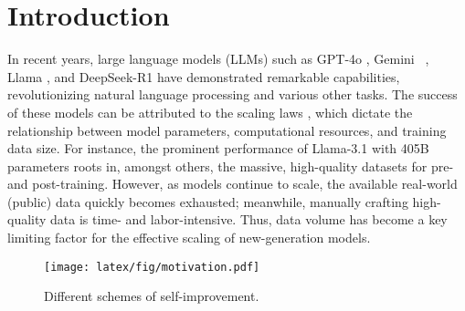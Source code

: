 \section{Introduction}

In recent years, large language models (LLMs) such as GPT-4o \cite{DBLP:journals/corr/abs-2410-21276}, Gemini~
\cite{DBLP:journals/corr/abs-2312-11805}, Llama \cite{DBLP:journals/corr/abs-2302-13971}, and DeepSeek-R1 \cite{guo2025deepseek} have demonstrated remarkable capabilities, revolutionizing natural language processing and various other tasks. The success of these models can be attributed to the scaling laws \cite{DBLP:journals/corr/abs-2001-08361}, which dictate the relationship between model parameters, computational resources, and training data size. 
For instance, the prominent performance of Llama-3.1 with 405B parameters \cite{DBLP:journals/corr/abs-2407-21783} roots in, amongst others, the massive, high-quality datasets for pre- and post-training. However, as models continue to scale, the available real-world (public) data quickly becomes exhausted; meanwhile, 
manually crafting high-quality %
data is time- and labor-intensive. Thus, data volume has become a key limiting factor for the effective scaling of new-generation models.

\begin{figure}[t]
  \texttt{[image: latex/fig/motivation.pdf]}
  \caption{Different schemes of self-improvement.}
  \label{fig:motivation}
\end{figure}

